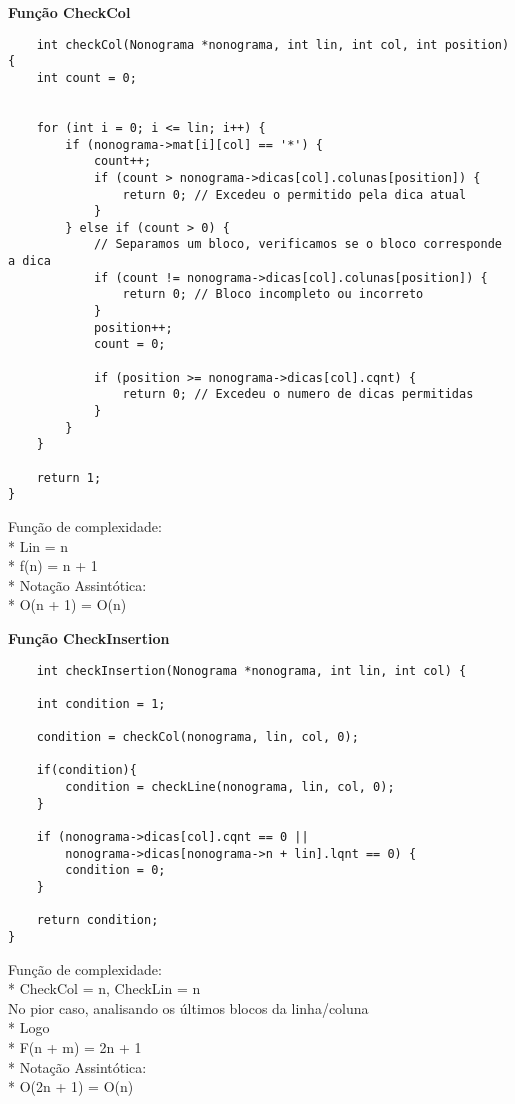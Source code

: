 \documentclass{article}
\begin{document}
\begin{center}
    \textbf{Função CheckCol}
\end{center}
\begin{lstlisting}
    int checkCol(Nonograma *nonograma, int lin, int col, int position) {
    int count = 0;


    for (int i = 0; i <= lin; i++) {
        if (nonograma->mat[i][col] == '*') {
            count++;
            if (count > nonograma->dicas[col].colunas[position]) {
                return 0; // Excedeu o permitido pela dica atual
            }
        } else if (count > 0) {
            // Separamos um bloco, verificamos se o bloco corresponde a dica
            if (count != nonograma->dicas[col].colunas[position]) {
                return 0; // Bloco incompleto ou incorreto
            }
            position++;
            count = 0;

            if (position >= nonograma->dicas[col].cqnt) {
                return 0; // Excedeu o numero de dicas permitidas
            }
        }
    }

    return 1;
}
\end{lstlisting}
\begin{center}
    Função de complexidade:\\
    * Lin = n\\
    * f(n) = n + 1\\
    * Notação Assintótica:\\
    * O(n + 1) = O(n)\\
\end{center}



\begin{center}
    \textbf{Função CheckInsertion}
\end{center}
\begin{lstlisting}
    int checkInsertion(Nonograma *nonograma, int lin, int col) {

    int condition = 1;

    condition = checkCol(nonograma, lin, col, 0);

    if(condition){
        condition = checkLine(nonograma, lin, col, 0);
    }

    if (nonograma->dicas[col].cqnt == 0 ||
        nonograma->dicas[nonograma->n + lin].lqnt == 0) {
        condition = 0;
    }

    return condition;
}
\end{lstlisting}
\begin{center}
    Função de complexidade:\\
    * CheckCol = n, CheckLin = n\\
      No pior caso, analisando os últimos blocos da linha/coluna\\
    * Logo\\
    * F(n + m) = 2n + 1\\
    * Notação Assintótica:\\
    * O(2n + 1) = O(n)\\
\end{center}
\end{document}
